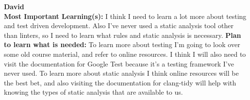 \documentclass[12pt, titlepage]{article}
\begin{document}
\noindent\textbf{David}\\
\textbf{Most Important Learning(s):} I think I need to learn a lot more about testing and test driven development.
Also I've never used a static analysis tool other than linters, so I need to learn what rules and static analysis
is necessary.
\textbf{Plan to learn what is needed:} To learn more about testing I'm going to look over some old course material,
and refer to online resources. I think I will also need to visit the documentation for Google Test because it's
a testing framework I've never used. To learn more about static analysis I think online resources will be the best
bet, and also visiting the documentation for clang-tidy will help with knowing the types of static analysis that
are available to us.\\
\end{document}
